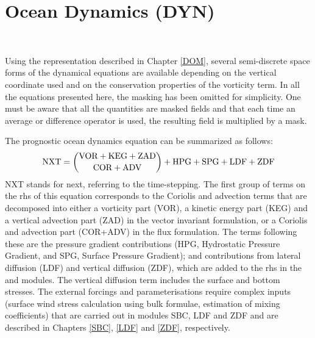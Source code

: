 \chapter{Ocean Dynamics (DYN)}
\label{DYN}
\minitoc


$\ $\newline      %

Using the representation described in Chapter \ref{DOM}, several semi-discrete 
space forms of the dynamical equations are available depending on the vertical 
coordinate used and on the conservation properties of the vorticity term. In all 
the equations presented here, the masking has been omitted for simplicity. 
One must be aware that all the quantities are masked fields and that each time an
average or difference operator is used, the resulting field is multiplied by a mask.

The prognostic ocean dynamics equation can be summarized as follows:
\begin{equation*}
\text{NXT} = \dbinom	{\text{VOR} + \text{KEG} + \text {ZAD} }
						{\text{COR} + \text{ADV}                       }
			+ \text{HPG} + \text{SPG} + \text{LDF} + \text{ZDF}
\end{equation*}
NXT stands for next, referring to the time-stepping. The first group of terms on 
the rhs of this equation corresponds to the Coriolis and advection 
terms that are decomposed into either a vorticity part (VOR), a kinetic energy part (KEG) 
and a vertical advection part (ZAD) in the vector invariant formulation, or a Coriolis 
and advection part (COR+ADV) in the flux formulation. The terms following these 
are the pressure gradient contributions (HPG, Hydrostatic Pressure Gradient, 
and SPG, Surface Pressure Gradient); and contributions from lateral diffusion 
(LDF) and vertical diffusion (ZDF), which are added to the rhs in the  
and  modules. The vertical diffusion term includes the surface and 
bottom stresses. The external forcings and parameterisations require complex 
inputs (surface wind stress calculation using bulk formulae, estimation of mixing 
coefficients) that are carried out in modules SBC, LDF and ZDF and are described 
in Chapters \ref{SBC}, \ref{LDF} and \ref{ZDF}, respectively. 

